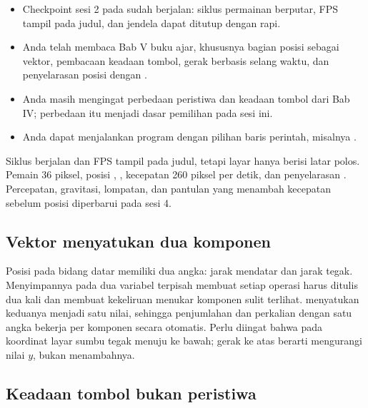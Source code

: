 \begin{prasyaratbox}
\begin{itemize}[leftmargin=1.4em, itemsep=0.25em]
  \item Checkpoint sesi 2 pada  sudah berjalan: siklus
        permainan berputar, FPS tampil pada judul, dan jendela dapat ditutup
        dengan rapi.
  \item Anda telah membaca Bab V buku ajar, khususnya bagian posisi sebagai
        vektor, pembacaan keadaan tombol, gerak berbasis selang waktu, dan
        penyelarasan posisi dengan .
  \item Anda masih mengingat perbedaan peristiwa dan keadaan tombol dari
        Bab IV; perbedaan itu menjadi dasar pemilihan
         pada sesi ini.
  \item Anda dapat menjalankan program dengan pilihan baris perintah, misalnya
        .
\end{itemize}
\end{prasyaratbox}


\petasesi
  {Siklus berjalan dan FPS tampil pada judul, tetapi layar hanya berisi latar
   polos.}
  {Pemain 36 piksel, posisi , ,
   kecepatan 260 piksel per detik, dan penyelarasan .}
  {Percepatan, gravitasi, lompatan, dan pantulan yang menambah kecepatan
   sebelum posisi diperbarui pada sesi 4.}


\subsection*{Vektor menyatukan dua komponen}

Posisi pada bidang datar memiliki dua angka: jarak mendatar dan jarak tegak.
Menyimpannya pada dua variabel terpisah membuat setiap operasi harus ditulis
dua kali dan membuat kekeliruan menukar komponen sulit terlihat.
 menyatukan keduanya menjadi satu nilai, sehingga
penjumlahan dan perkalian dengan satu angka bekerja per komponen secara
otomatis. Perlu diingat bahwa pada koordinat layar sumbu tegak menuju ke bawah;
gerak ke atas berarti mengurangi nilai $y$, bukan menambahnya.

\subsection*{Keadaan tombol bukan peristiwa}

